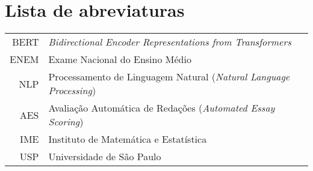 \documentclass[12pt,twoside,english,brazilian]{book}
\begin{document}
\makeatletter
\if@openright\cleardoublepage\else\clearpage\fi
\makeatother


\newcommand\disablenewpage[1]{{\let\clearpage\par\let\cleardoublepage\par #1}}

\bgroup
\raggedbottom


\disablenewpage{\chapter*{Lista de abreviaturas}}

\begin{tabular}{rl}
    BERT & \emph{Bidirectional Encoder Representations from Transformers}\\
    ENEM & Exame Nacional do Ensino Médio\\
    NLP & Processamento de Linguagem Natural (\emph{Natural Language Processing})\\
    AES & Avaliação Automática de Redações (\emph{Automated Essay Scoring})\\
    IME & Instituto de Matemática e Estatística\\
    USP & Universidade de São Paulo
\end{tabular}
\end{document}
